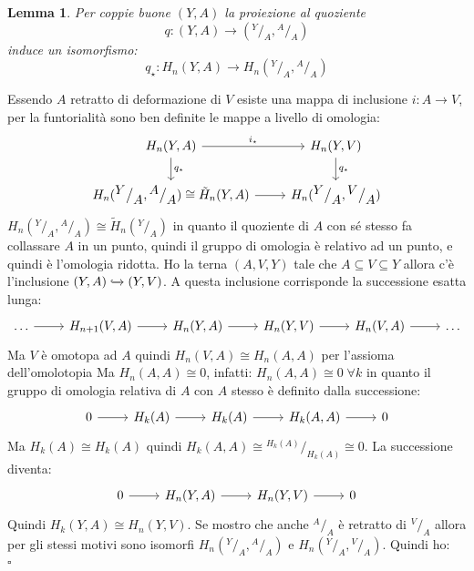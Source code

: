 \documentclass[10pt, twoside=false, x11names]{scrbook}
\newtheorem{lemma}[theorem]{Lemma}
\newenvironment{proof}{{\textbf{Dimostrazione}:}}{\hfill $\square$}
\newcommand{\incl}{\xhookrightarrow{}}
\newcommand*\quot[2]{{^{\textstyle #1}\big/_{\textstyle #2}}}
\begin{document}
\begin{lemma}
  Per coppie buone $ (Y,A) $ la proiezione al quoziente
  \[
    q \colon (Y,A) \to \left(\quot{Y}{A}, \quot{A}{A} \right)
  \]
  induce un isomorfismo:
  \[
    q_\star \colon H_n(Y,A) \to  H_n(\quot{Y}{A}, \quot{A}{A})
  \]
\end{lemma}
\begin{proof}
  Essendo $ A $ retratto di deformazione di $ V $ esiste
  una mappa di inclusione $ i \colon A \to V $, per la funtorialità
  sono ben definite le mappe a livello di omologia:
  \[
    \begin{tikzcd}
      H_n(Y,A) \rar{i_\star} \dar{q_\star} & H_n(Y,V) \dar{q_\star} \\
      H_n(\quot{Y}{A}, \quot{A}{A}) \cong \tilde{H}_n(Y,A) \rar & H_n(\quot{Y}{A}, \quot{V}{A})
    \end{tikzcd}
  \]
  $  H_n(\quot{Y}{A}, \quot{A}{A}) \cong \tilde{H}_n(\quot{Y}{A}) $ in quanto il quoziente
  di $ A $ con sé stesso fa collassare $ A $ in un punto, quindi il gruppo di omologia
  è relativo ad un punto, e quindi è l'omologia ridotta.
  Ho la terna $ (A, V, Y) $ tale che $ A \subseteq V \subseteq Y $ allora c'è l'inclusione
  $ (Y,A) \incl (Y,V) $. A questa inclusione corrisponde la successione esatta lunga:
  \[
    \begin{tikzcd}
      \dots \rar & H_{n+1}(V, A) \rar & H_n(Y, A) \rar & H_n(Y,V) \rar & H_{n}(V,A) \rar & \dots
    \end{tikzcd}
  \]
  Ma $ V $ è omotopa ad $ A $ quindi $ H_n(V,A) \cong H_n(A,A) $ per l'assioma dell'omolotopia
  Ma $ H_n(A,A) \cong 0 $, infatti:
  $ H_n(A,A) \cong 0 \; \forall k $ in quanto il gruppo di omologia relativa
  di $ A $ con $ A $ stesso è definito dalla successione:
  \[
    \begin{tikzcd}
      0 \rar   & H_k(A) \rar  & H_k(A) \rar  & H_k(A,A) \rar & 0
    \end{tikzcd}
  \]
  Ma $ H_k(A) \cong H_k(A) $ quindi  $ H_k(A,A) \cong \quot{H_k(A)}{H_k(A)} \cong 0 $.
  La successione diventa:
  \[
    \begin{tikzcd}
      0 \rar & H_n(Y, A) \rar & H_n(Y,V) \rar & 0
    \end{tikzcd}
  \]
  Quindi $ H_k(Y,A) \cong H_n(Y,V) $.
  Se mostro che anche $ \quot{A}{A} $ è retratto di $ \quot{V}{A} $
  allora per  gli stessi motivi sono isomorfi
  $ H_n(\quot{Y}{A}, \quot{A}{A}) $ e $ H_n(\quot{Y}{A}, \quot{V}{A}) $.
  Quindi ho:
  \begin{align*}

\end{align*}
\end{proof}
\end{document}
